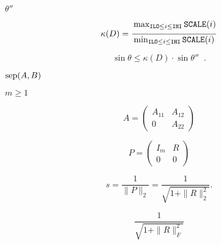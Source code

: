 {\newpage\clearpage
{}%
$\theta''$%
\lthtmlinlinemathZ
\lthtmlcheckvsize\clearpage}

{\newpage\clearpage
{}%
\begin{displaymath}
\kappa (D) =
\frac{{\rule[-.25cm]{0cm}{.5cm} \max_{{\tt ILO} \leq i \leq {\tt IHI}}
{\tt SCALE}(i)}}
{\min_{{\tt ILO} \leq i \leq {\tt IHI}} {\tt SCALE}(i)}
\end{displaymath}%
\lthtmldisplayZ
\lthtmlcheckvsize\clearpage}

{\newpage\clearpage
{}%
\begin{displaymath}
\sin \theta \leq \kappa(D) \cdot \sin \theta'' \; \; .
\end{displaymath}%
\lthtmldisplayZ
\lthtmlcheckvsize\clearpage}

{\newpage\clearpage
{}%
${\rm sep}(A,B)$%
\lthtmlinlinemathZ
\lthtmlcheckvsize\clearpage}

{\newpage\clearpage
{}%
$m \geq 1$%
\lthtmlinlinemathZ
\lthtmlcheckvsize\clearpage}

{\newpage\clearpage
{}%
\begin{displaymath}
A  = \left( \begin{array}{cc} A_{11} & A_{12} \\0 & A_{22} \end{array} \right) 
\end{displaymath}%
\lthtmldisplayZ
\lthtmlcheckvsize\clearpage}

{\newpage\clearpage
{}%
\begin{displaymath}
P = \left( \begin{array}{cc} I_m & R \\0 & 0 \end{array} \right) 
\end{displaymath}%
\lthtmldisplayZ
\lthtmlcheckvsize\clearpage}

{\newpage\clearpage
{}%
\begin{displaymath}
s = \frac{1}{\|P\|_2} = \frac{1}{\sqrt{1+\|R\|_2^2}}.
\end{displaymath}%
\lthtmldisplayZ
\lthtmlcheckvsize\clearpage}

{\newpage\clearpage
{}%
\begin{displaymath}
\frac{1}{\sqrt{1+\|R\|_F^2}}
\end{displaymath}%
\lthtmldisplayZ
\lthtmlcheckvsize\clearpage}

